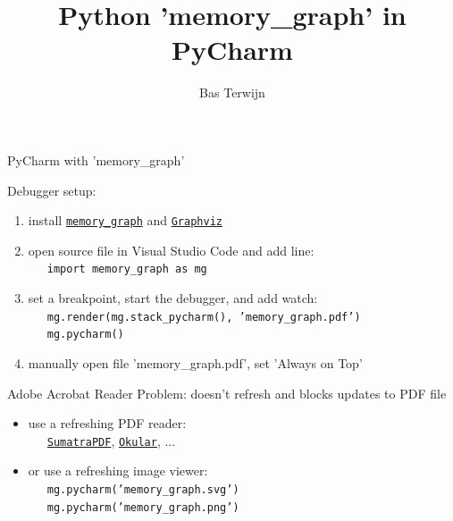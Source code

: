 \documentclass[10pt, colorlinks=true, urlcolor=blue]{beamer}
\title{Python 'memory\_graph' in PyCharm}
\author{Bas Terwijn}
\date{}
\begin{document}
\begin{frame}
    \titlepage
\end{frame}

\begin{frame}{PyCharm with 'memory\_graph'}

  Debugger setup:
  \begin{enumerate}
  \item install \href{https://pypi.org/project/memory-graph/}{\texttt{memory\_graph}} and \href{https://graphviz.org/download/}{\texttt{Graphviz}}
  \item open source file in Visual Studio Code and add line: \\
    \ \ \ {\footnotesize \texttt{import memory_graph as mg}}
  \item set a breakpoint, start the debugger, and add watch: \\
    \ \ \ {\footnotesize \texttt{mg.render(mg.stack_pycharm(), 'memory_graph.pdf')}} \\
    \ \ \ {\footnotesize \texttt{mg.pycharm()}}
  \item manually open file 'memory\_graph.pdf',  set 'Always on Top'
  \end{enumerate}
  
  \vspace{1.8em}
  
  Adobe Acrobat Reader Problem: doesn't refresh and blocks updates to PDF file
  \begin{itemize}
  \item use a refreshing PDF reader: \\ \ \ \
    \href{https://www.sumatrapdfreader.org/}{\texttt{SumatraPDF}},
    \href{https://okular.kde.org/}{\texttt{Okular}}, ...
  \item or use a refreshing image viewer: \\
\ \ \ {\footnotesize \texttt{mg.pycharm('memory_graph.svg')}} \\
\ \ \ {\footnotesize \texttt{mg.pycharm('memory_graph.png')}}
  \end{itemize}
\end{frame}
\end{document}
